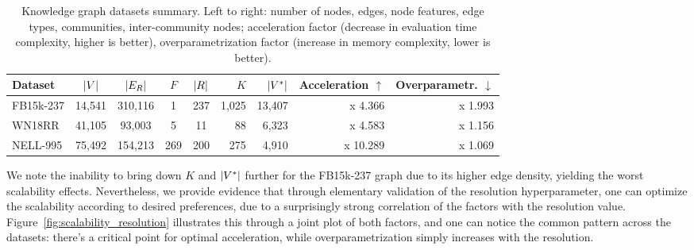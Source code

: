\begin{table}[H]
  \caption[Knowledge graph datasets summary.]{Knowledge graph datasets summary. Left to right: number of nodes, edges, node features, edge types, communities, inter-community nodes; acceleration factor (decrease in evaluation time complexity, higher is better), overparametrization factor (increase in memory complexity, lower is better).}
  \label{tab:datasets}
  \centering
  \begin{adjustbox}{width=\textwidth}
  \begin{tabular}{lccccrrrr}
    \toprule
    Dataset & $\mathopen{}\left|V\right|$ & $\mathopen{}\left|E_R\right|$ & $F$ & $\mathopen{}\left|R\right|$ & $K$ & $\mathopen{}\left|V^*\right|$ & Acceleration $\uparrow$ & Overparametr. $\downarrow$ \\ %
    \midrule
    FB15k-237 & 14,541 & 310,116 & 1 & 237 & 1,025 & 13,407 & x 4.366 & x 1.993 \\
    WN18RR & 41,105 & 93,003 & 5 & 11 & 88 & 6,323 & x 4.583 & x 1.156 \\
    NELL-995 & 75,492 & 154,213 & 269 & 200 & 275 & 4,910 & x 10.289 & x 1.069 \\
    \bottomrule
  \end{tabular}
  \end{adjustbox}
\end{table}

We note the inability to bring down $K$ and $\mathopen{}\left|V^*\right|$ further for the FB15k-237 graph due to its higher edge density, yielding the worst scalability effects. Nevertheless, we provide evidence that through elementary validation of the resolution hyperparameter, one can optimize the scalability according to desired preferences, due to a surprisingly strong correlation of the factors with the resolution value. Figure~\ref{fig:scalability_resolution} illustrates this through a joint plot of both factors, and one can notice the common pattern across the datasets: there's a critical point for optimal acceleration, while overparametrization simply increases with the resolution.

